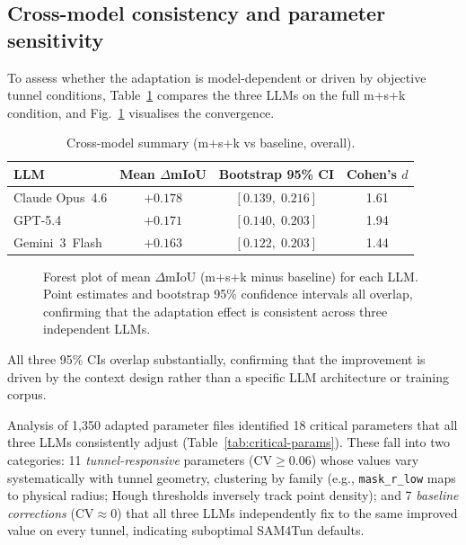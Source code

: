 \documentclass[a4paper,fleqn]{cas-dc}
\begin{document}
\subsection{Cross-model consistency and parameter sensitivity}\label{sec:sensitivity}

To assess whether the adaptation is model-dependent or driven by objective tunnel conditions, Table~\ref{tab:cross-model} compares the three LLMs on the full m+s+k condition, and Fig.~\ref{fig:forest} visualises the convergence.

\begin{table}[ht]
\caption{Cross-model summary (m+s+k vs baseline, overall).}\label{tab:cross-model}
\begin{tabular*}{\tblwidth}{@{} l c c c @{}}
\toprule
LLM & Mean $\Delta$mIoU & Bootstrap 95\% CI & Cohen's $d$ \\
\midrule
Claude Opus~4.6 & $+0.178$ & $[0.139,\; 0.216]$ & 1.61 \\
GPT-5.4 & $+0.171$ & $[0.140,\; 0.203]$ & 1.94 \\
Gemini~3~Flash & $+0.163$ & $[0.122,\; 0.203]$ & 1.44 \\
\bottomrule
\end{tabular*}
\end{table}

\begin{figure}[t]
\centering
\caption{Forest plot of mean $\Delta$mIoU (m+s+k minus baseline) for each LLM. Point estimates and bootstrap 95\% confidence intervals all overlap, confirming that the adaptation effect is consistent across three independent LLMs.}
\label{fig:forest}
\end{figure}

All three 95\% CIs overlap substantially, confirming that the improvement is driven by the context design rather than a specific LLM architecture or training corpus.

Analysis of 1{,}350 adapted parameter files identified 18 critical parameters that all three LLMs consistently adjust (Table~\ref{tab:critical-params}). These fall into two categories: 11 \emph{tunnel-responsive} parameters ($\text{CV} \geq 0.06$) whose values vary systematically with tunnel geometry, clustering by family (e.g., \texttt{mask\_r\_low} maps to physical radius; Hough thresholds inversely track point density); and 7 \emph{baseline corrections} ($\text{CV} \approx 0$) that all three LLMs independently fix to the same improved value on every tunnel, indicating suboptimal SAM4Tun defaults.
\end{document}
